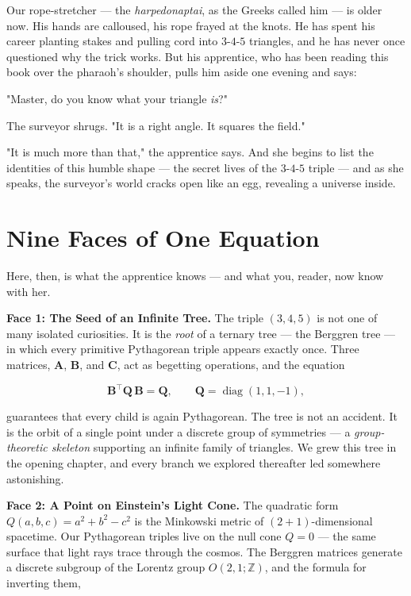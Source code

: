 \documentclass[11pt,twoside,openright]{book}
\theoremstyle{definition}
\theoremstyle{remark}
\begin{document}
Our rope-stretcher --- the \textit{harpedonaptai}, as the Greeks called him --- is older now. His hands are calloused, his rope frayed at the knots. He has spent his career planting stakes and pulling cord into $3$-$4$-$5$ triangles, and he has never once questioned why the trick works. But his apprentice, who has been reading this book over the pharaoh's shoulder, pulls him aside one evening and says:

"Master, do you know what your triangle \textit{is}?"

The surveyor shrugs. "It is a right angle. It squares the field."

"It is much more than that," the apprentice says. And she begins to list the identities of this humble shape --- the secret lives of the $3$-$4$-$5$ triple --- and as she speaks, the surveyor's world cracks open like an egg, revealing a universe inside.



\section{Nine Faces of One Equation}

Here, then, is what the apprentice knows --- and what you, reader, now know with her.

\textbf{Face 1: The Seed of an Infinite Tree.} The triple $(3, 4, 5)$ is not one of many isolated curiosities. It is the \textit{root} of a ternary tree --- the Berggren tree --- in which every primitive Pythagorean triple appears exactly once. Three matrices, $\mathbf{A}$, $\mathbf{B}$, and $\mathbf{C}$, act as begetting operations, and the equation

\[\mathbf{B}^{\!\top} \mathbf{Q}\, \mathbf{B} = \mathbf{Q}, \qquad \mathbf{Q} = \operatorname{diag}(1, 1, -1),\]

guarantees that every child is again Pythagorean. The tree is not an accident. It is the orbit of a single point under a discrete group of symmetries --- a \textit{group-theoretic skeleton} supporting an infinite family of triangles. We grew this tree in the opening chapter, and every branch we explored thereafter led somewhere astonishing.

\textbf{Face 2: A Point on Einstein's Light Cone.} The quadratic form $Q(a, b, c) = a^2 + b^2 - c^2$ is the Minkowski metric of $(2{+}1)$-dimensional spacetime. Our Pythagorean triples live on the null cone $Q = 0$ --- the same surface that light rays trace through the cosmos. The Berggren matrices generate a discrete subgroup of the Lorentz group $O(2,1;\mathbb{Z})$, and the formula for inverting them,
\end{document}
